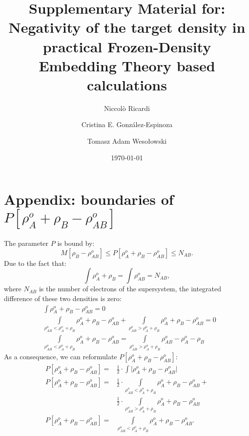 \documentclass[amsmath,amssymb,preprint,aip,jcp]{revtex4-1}
\begin{document}
\author{Niccol\`{o} Ricardi}
\author{Cristina E. Gonz\'{a}lez-Espinoza}
\author{Tomasz Adam Weso\l{}owski}
% 
\date{\today}
\title{Supplementary Material for: Negativity of the target density in practical Frozen-Density Embedding Theory based calculations}

\maketitle
\section{Appendix: boundaries of $P[\rho^{o}_A + \rho_B - \rho_{AB}^o]$}
The parameter $P$ is bound by:
\begin{equation} \label{eq:P_bound}
 M[\rho_{B} - \rho^{o}_{AB}] \leq P[\rho_A^o+\rho_B - \rho_{AB}^{o}] \leq %
 N_{AB}.
\end{equation}
Due to the fact that:
\begin{equation}
 \int \rho^{o}_A + \rho_B = \int \rho_{AB}^o = N_{AB},
\end{equation}
where $N_{AB}$ is the number of electrons of the supersystem, the integrated difference of these two densities is zero:
\begin{align}
 & \int \rho^{o}_A + \rho_B - \rho_{AB}^o = 0 \\ \nonumber
 & \int\limits_{\rho_{AB}^o <\rho^{o}_A + \rho_B}\rho^{o}_A + \rho_B - \rho_{AB}^o + \int\limits_{\rho_{AB}^o > \rho^{o}_A + \rho_B}\rho^{o}_A + \rho_B - \rho_{AB}^o = 0 \\ \nonumber
 & \int\limits_{\rho_{AB}^o < \rho^{o}_A + \rho_B}\rho^{o}_A + \rho_B - \rho_{AB}^o = \int\limits_{\rho_{AB}^o > \rho^{o}_A + \rho_B}\rho_{AB}^o - \rho^{o}_A - \rho_B 
\end{align}
As a consequence, we can reformulate $P[\rho^{o}_A + \rho_B - \rho_{AB}^o]$:
\begin{align}\label{eq:P_alternatives}
P[\rho^{o}_A + \rho_B - \rho_{AB}^o] = & \frac{1}{2} \cdot \int \vert \rho^{o}_A + \rho_B - \rho_{AB}^o \vert \\ \nonumber
P[\rho^{o}_A + \rho_B - \rho_{AB}^o] = & \frac{1}{2} \cdot \int\limits_{\rho_{AB}^o <\rho^{o}_A + \rho_B}\rho^{o}_A + \rho_B - \rho_{AB}^o + \\ \nonumber
 & \frac{1}{2} \cdot \int\limits_{\rho_{AB}^o > \rho^{o}_A + \rho_B}\rho^{o}_A + \rho_B - \rho_{AB}^o \\ \nonumber
P[\rho^{o}_A + \rho_B - \rho_{AB}^o] = & \int\limits_{\rho_{AB}^o <\rho^{o}_A + \rho_B}\rho^{o}_A + \rho_B - \rho_{AB}^o.
\end{align}
\end{document}
